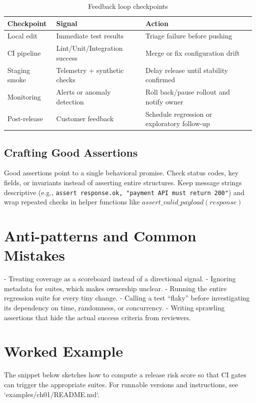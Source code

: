 \begin{table}[h]
\centering
\caption{Feedback loop checkpoints}
\label{tab:feedback-checkpoints}
\begin{tabular}{p{3cm}p{5cm}p{4cm}}
\toprule
Checkpoint & Signal & Action \\
\midrule
Local edit & Immediate test results & Triage failure before pushing \\
CI pipeline & Lint/Unit/Integration success & Merge or fix configuration drift \\
Staging smoke & Telemetry + synthetic checks & Delay release until stability confirmed \\
Monitoring & Alerts or anomaly detection & Roll back/pause rollout and notify owner \\
Post-release & Customer feedback & Schedule regression or exploratory follow-up \\
\bottomrule
\end{tabular}
\end{table}

\subsection{Crafting Good Assertions}

Good assertions point to a single behavioral promise. Check status codes, key fields, or invariants instead of asserting entire structures. Keep message strings descriptive (e.g., \texttt{assert response.ok, "payment API must return 200"}) and wrap repeated checks in helper functions like \texttt{$assert\_valid\_payload(response)$}

\section{Anti-patterns and Common Mistakes}

- Treating coverage as a scoreboard instead of a directional signal.
- Ignoring metadata for suites, which makes ownership unclear.
- Running the entire regression suite for every tiny change.
- Calling a test “flaky” before investigating its dependency on time, randomness, or concurrency.
- Writing sprawling assertions that hide the actual success criteria from reviewers.

\section{Worked Example}

The snippet below sketches how to compute a release risk score so that CI gates can trigger the appropriate suites. For runnable versions and instructions, see `examples/ch01/README.md`.

